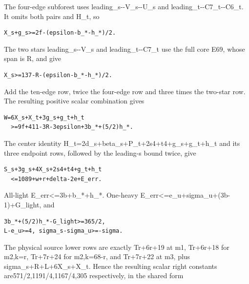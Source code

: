 \documentclass[10pt,a4paper]{article}
\theoremstyle{definition}
\begin{document}
The four-edge subforest uses leading\_\allowbreak{}s-\/-V\_\allowbreak{}s-\/-U\_\allowbreak{}s and
leading\_\allowbreak{}t-\/-C7\_\allowbreak{}t-\/-C6\_\allowbreak{}t. It omits both pairs and H\_\allowbreak{}t,\allowbreak{} so

\begin{lstlisting}
X_s+g_s>=2f-(epsilon-b_*-h_*)/2.
\end{lstlisting}

The two stars leading\_\allowbreak{}s-\/-V\_\allowbreak{}s and leading\_\allowbreak{}t-\/-C7\_\allowbreak{}t use the full
core E69,\allowbreak{} whose span is R,\allowbreak{} and give

\begin{lstlisting}
X_s>=137-R-(epsilon-b_*-h_*)/2.
\end{lstlisting}

Add the ten-edge row,\allowbreak{} twice the four-edge row and three times the
two-star row. The resulting positive scalar combination gives

\begin{lstlisting}
W=6X_s+X_t+3g_s+g_t+h_t
  >=9f+411-3R-3epsilon+3b_*+(5/2)h_*.
\end{lstlisting}

The center identity H\_\allowbreak{}t=\allowbreak{}2d\_\allowbreak{}s+\allowbreak{}beta\_\allowbreak{}s+\allowbreak{}P\_\allowbreak{}t+\allowbreak{}2s4+\allowbreak{}t4+\allowbreak{}g\_\allowbreak{}s+\allowbreak{}g\_\allowbreak{}t+\allowbreak{}h\_\allowbreak{}t and
its three endpoint rows,\allowbreak{} followed by the leading-s bound twice,\allowbreak{} give

\begin{lstlisting}
S_s+3g_s+4X_s+2s4+t4+g_t+h_t
  <=1089+w+r+delta-2e+E_err.
\end{lstlisting}

All-light E\_\allowbreak{}err\textless=\allowbreak{}3b+\allowbreak{}b\_\allowbreak{}*+\allowbreak{}h\_\allowbreak{}*. One-heavy
E\_\allowbreak{}err\textless=\allowbreak{}e\_\allowbreak{}u+\allowbreak{}sigma\_\allowbreak{}u+\allowbreak{}(3b-1)+\allowbreak{}G\_\allowbreak{}light,\allowbreak{} and

\begin{lstlisting}
3b_*+(5/2)h_*-G_light>=365/2,
L-e_u>=4, sigma_s-sigma_u>=-sigma.
\end{lstlisting}

The physical source lower rows are exactly Tr+\allowbreak{}6r+\allowbreak{}19 at m1,\allowbreak{} Tr+\allowbreak{}6r+\allowbreak{}18 for
m2,\allowbreak{}k=\allowbreak{}r,\allowbreak{} Tr+\allowbreak{}7r+\allowbreak{}24 for m2,\allowbreak{}k=\allowbreak{}68-r,\allowbreak{} and Tr+\allowbreak{}7r+\allowbreak{}22 at m3,\allowbreak{} plus
sigma\_\allowbreak{}s+\allowbreak{}R+\allowbreak{}L+\allowbreak{}6X\_\allowbreak{}s+\allowbreak{}X\_\allowbreak{}t. Hence the resulting scalar right constants
are571/2,\allowbreak{}1191/4,\allowbreak{}1167/4,\allowbreak{}305 respectively,\allowbreak{} in the shared form
\end{document}
